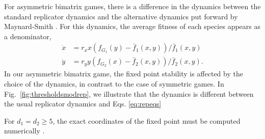 \documentclass{pnastwo}
\begin{document}
\begin{article}
For asymmetric bimatrix games, there is a difference in the dynamics between the standard replicator dynamics and the 
alternative dynamics put forward by Maynard-Smith \cite{maynard-smith:1982to}.
For this dynamics, the average fitness of each species appears as a denominator,
\begin{align}
\dot{x} &= r_x x \left(f_{G_1}(y) -  \bar{f}_1(x,y) \right)/\bar{f}_1(x,y) \nonumber \\
\dot{y} &= r_y y \left(f_{G_2}(x) -  \bar{f}_2(x,y) \right)/\bar{f}_2(x,y).
\label{eq:repeqs}
\end{align}
In our asymmetric bimatrix game, the fixed point stability is affected by the choice of the dynamics, in contrast to the case of symmetric games. 
In Fig.\ \ref{fig:thresholdsmodrep}, we illustrate that the dynamics is different between the usual 
replicator dynamics and Eqs. \ref{eq:repeqs}

For $d_1=d_2 \geq 5$, the exact coordinates of the fixed point must be computed numerically \cite{abel:1824aa,stewart:2004aa}.





\end{article}
\end{document}
